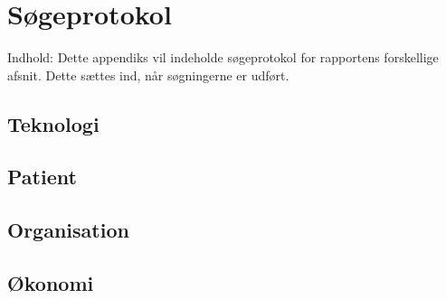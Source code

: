 \chapter{Søgeprotokol}\label{app:soegeprotokol}
Indhold: Dette appendiks vil indeholde søgeprotokol for rapportens forskellige afsnit. Dette sættes ind, når søgningerne er udført. 

\section{Teknologi}
\section{Patient}
\section{Organisation}
\section{Økonomi}